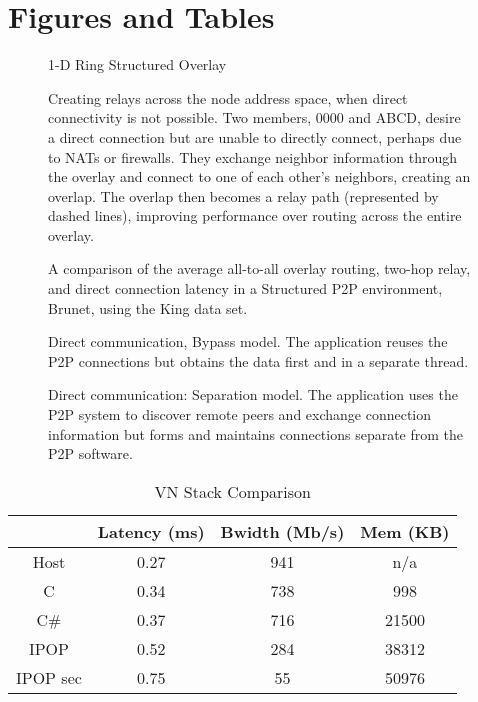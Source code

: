 \section{Figures and Tables}

\begin{figure}[ht]
\centering
{}
\caption{1-D Ring Structured Overlay}
\label{fig:ring_overlay}
\end{figure}

\begin{figure}[ht]
\centering
{}
\caption[Proactive relay creation]{Creating relays across the node address
space, when direct connectivity is not possible.  Two members, 0000 and ABCD, 
desire a direct connection but are unable to directly connect, perhaps due to
NATs or firewalls.  They exchange neighbor information through the overlay and
connect to one of each other's neighbors, creating an overlap.  The overlap
then becomes a relay path (represented by dashed lines), improving performance
over routing across the entire overlay.}
\label{fig:relay}
\end{figure}

\begin{figure}[ht]
\centering
{}
\caption[Relay evaluation]{A comparison of the average all-to-all overlay
routing, two-hop relay, and direct connection latency in a Structured P2P
environment, Brunet, using the King data set.}
\label{fig:simulated_relays}
\end{figure}

\begin{figure}[ht]
\centering
{}
\caption[Direct communication: Bypass model]{Direct communication, Bypass model.
The application reuses the P2P connections but obtains the data first and in a
separate thread.}
\label{fig:direct_communication_1}
\end{figure}

\begin{figure}[ht]
\centering
{}
\caption[Direct communication: Separation model]{Direct communication: Separation
model.  The application uses the P2P system to discover remote peers and exchange
connection information but forms and maintains connections separate from the P2P
software.}
\label{fig:direct_communication_2}
\end{figure}

\begin{table}[ht]
\caption{VN Stack Comparison}
\label{tab:vpn_eval_comp}
\begin{tabular}{c||c|c|c}
& Latency (ms) & Bwidth (Mb/s) & Mem (KB) \\\hline
Host & 0.27 & 941 & n/a \\\hline
C & 0.34 & 738 & 998 \\\hline
C\# & 0.37 & 716 & 21500 \\\hline
IPOP & 0.52 & 284 & 38312 \\\hline
IPOP sec & 0.75 & 55 & 50976 \\\hline
\end{tabular}
\centering
\end{table}
